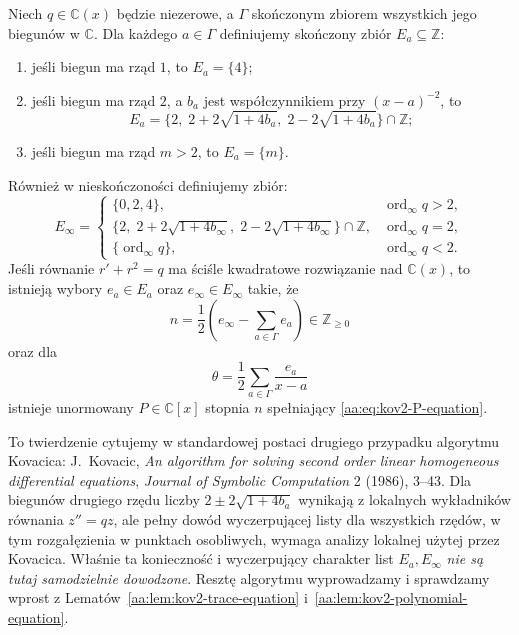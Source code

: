 \begin{twierdzenie}
\label{aa:tw:kov2-classical-candidates}
Niech $q\in\mathbb C(x)$ będzie
niezerowe, a $\Gamma$ skończonym
zbiorem wszystkich jego biegunów
w $\mathbb C$.
Dla każdego $a\in\Gamma$
definiujemy skończony zbiór
$E_a\subseteq\mathbb Z$:
\begin{enumerate}
\item jeśli biegun ma rząd $1$,
to $E_a=\{4\}$;
\item jeśli biegun ma rząd $2$,
a $b_a$ jest współczynnikiem
przy $(x-a)^{-2}$, to
\[
 E_a=\{2,\;2+2\sqrt{1+4b_a},
                 \;2-2\sqrt{1+4b_a}\}
                 \cap\mathbb Z;
\]
\item jeśli biegun ma rząd $m>2$,
to $E_a=\{m\}$.
\end{enumerate}
Również w nieskończoności
definiujemy zbiór:
\[
 E_\infty=
 \begin{cases}
 \{0,2,4\},
   &\operatorname{ord}_\infty q>2,\\
 \{2,\;2+2\sqrt{1+4b_\infty},
              \;2-2\sqrt{1+4b_\infty}\}
              \cap\mathbb Z,
   &\operatorname{ord}_\infty q=2,\\
 \{\operatorname{ord}_\infty q\},
   &\operatorname{ord}_\infty q<2.
 \end{cases}
\]
Jeśli równanie $r'+r^2=q$
ma ściśle kwadratowe
rozwiązanie nad $\mathbb C(x)$,
to istnieją wybory
$e_a\in E_a$ oraz
$e_\infty\in E_\infty$
takie, że
\begin{equation}\label{aa:eq:kov2-degree}
 n=\frac12\left(e_\infty-
                      \sum_{a\in\Gamma}e_a\right)
 \in\mathbb Z_{\ge0}
\end{equation}
oraz dla
\begin{equation}\label{aa:eq:kov2-theta}
 \theta=\frac12\sum_{a\in\Gamma}
                     \frac{e_a}{x-a}
\end{equation}
istnieje unormowany
$P\in\mathbb C[x]$
stopnia $n$ spełniający
\eqref{aa:eq:kov2-P-equation}.
\end{twierdzenie}

\begin{uwaga}
\label{aa:uw:kov2-local-cited}
To twierdzenie cytujemy
w standardowej postaci
drugiego przypadku algorytmu
Kovacica: J.~Kovacic,
\emph{An algorithm for solving
second order linear homogeneous
differential equations},
\emph{Journal of Symbolic Computation}
2 (1986), 3--43.
Dla biegunów drugiego rzędu
liczby $2\pm2\sqrt{1+4b_a}$
wynikają z lokalnych
wykładników równania
$z''=qz$, ale pełny
dowód wyczerpującej listy
dla wszystkich rzędów,
w tym rozgałęzienia
w punktach osobliwych,
wymaga analizy lokalnej
użytej przez Kovacica.
Właśnie ta konieczność
i wyczerpujący charakter
list $E_a,E_\infty$
\emph{nie są tutaj
samodzielnie dowodzone}.
Resztę algorytmu
wyprowadzamy i sprawdzamy
wprost z
Lematów~\ref{aa:lem:kov2-trace-equation}
i~\ref{aa:lem:kov2-polynomial-equation}.
\end{uwaga}

